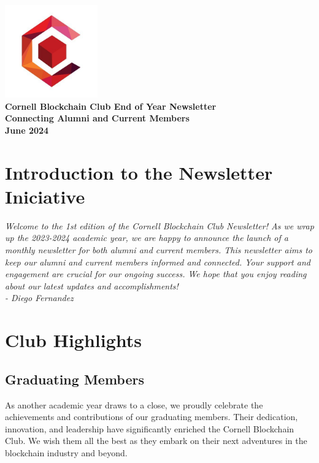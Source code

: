 \documentclass[10pt]{article}
\begin{document}
\begin{center}
    \includegraphics[width=0.3\textwidth]{logo.jpg} \\ %
    \huge \textbf{Cornell Blockchain Club End of Year Newsletter} \\
    \large \textbf{Connecting Alumni and Current Members} \\
    \large \textbf{June 2024}
\end{center}

\vspace{1cm}

\section*{Introduction to the Newsletter Iniciative} 
\textit{Welcome to the 1st edition of the Cornell Blockchain Club Newsletter! As we wrap up the 2023-2024 academic year, we are happy to announce the launch of a monthly newsletter for both alumni and current members. This newsletter aims to keep our alumni and current members informed and connected. Your support and engagement are crucial for our ongoing success. We hope that you enjoy reading about our latest updates and accomplishments!}
\\
\textit{- Diego Fernandez}


\section*{Club Highlights}
\subsection*{Graduating Members}
As another academic year draws to a close, we proudly celebrate the achievements and contributions of our graduating members. Their dedication, innovation, and leadership have significantly enriched the Cornell Blockchain Club. We wish them all the best as they embark on their next adventures in the blockchain industry and beyond. 
\end{document}
